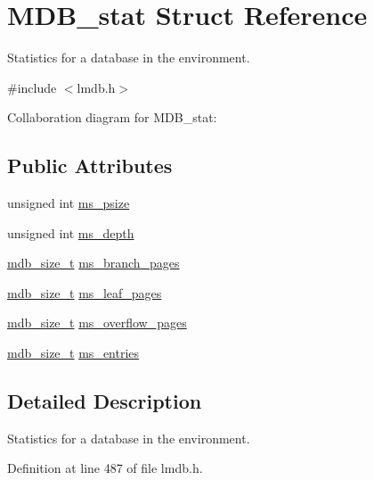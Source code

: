 \hypertarget{struct_m_d_b__stat}{}\section{M\+D\+B\+\_\+stat Struct Reference}
\label{struct_m_d_b__stat}


Statistics for a database in the environment.  




{\ttfamily \#include $<$lmdb.\+h$>$}



Collaboration diagram for M\+D\+B\+\_\+stat\+:
\subsection*{Public Attributes}
\begin{DoxyCompactItemize}
\item 
unsigned int \mbox{\hyperlink{struct_m_d_b__stat_a770440a4f2dec8592ae8f86c80895516}{ms\+\_\+psize}}
\item 
unsigned int \mbox{\hyperlink{struct_m_d_b__stat_ab4e70f35499a7e7c71429b04ac62de68}{ms\+\_\+depth}}
\item 
\mbox{\hyperlink{lmdb_8h_a78821971e612e3898ef4b3ae45ed86f1}{mdb\+\_\+size\+\_\+t}} \mbox{\hyperlink{struct_m_d_b__stat_a7aa982a4930af52421cd698852f39cd8}{ms\+\_\+branch\+\_\+pages}}
\item 
\mbox{\hyperlink{lmdb_8h_a78821971e612e3898ef4b3ae45ed86f1}{mdb\+\_\+size\+\_\+t}} \mbox{\hyperlink{struct_m_d_b__stat_abbcde1ee2a6131f5c815c41dd75f8ce8}{ms\+\_\+leaf\+\_\+pages}}
\item 
\mbox{\hyperlink{lmdb_8h_a78821971e612e3898ef4b3ae45ed86f1}{mdb\+\_\+size\+\_\+t}} \mbox{\hyperlink{struct_m_d_b__stat_afa3924f9dc1241ba89c117b4c0d189ca}{ms\+\_\+overflow\+\_\+pages}}
\item 
\mbox{\hyperlink{lmdb_8h_a78821971e612e3898ef4b3ae45ed86f1}{mdb\+\_\+size\+\_\+t}} \mbox{\hyperlink{struct_m_d_b__stat_a28bb7e00d1098ccfd44a10eca4aa8403}{ms\+\_\+entries}}
\end{DoxyCompactItemize}


\subsection{Detailed Description}
Statistics for a database in the environment. 

Definition at line 487 of file lmdb.\+h.



